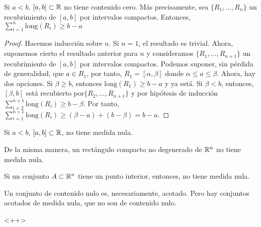 \begin{lema}
	Si $a < b$, $[a,b] \subset \mathbb{R}$ no tiene contenido cero. Más precisamente,
	sea $\{R_1,\dots,R_n\}$ un recubrimiento de $[a,b]$ por intervalos compactos.
	Entonces, $\sum\limits^{n}_{i=1} \text{long}(R_i) \geq b-a$
\end{lema}
\begin{proof}
	Hacemos inducción sobre $n$. Si $n = 1$, el resultado es trivial. Ahora,
	suponemos cierto el resultado anterior para $n$ y consideramos
	$\{R_1,\dots,R_{n+1}\}$ un recubrimiento de $[a,b]$ por intervalos compactos.
	Podemos suponer, sin p\'erdida de generalidad, que $a \in R_1$, por tanto,
	$R_1 = [\alpha,\beta]$ donde $\alpha \leq a \leq \beta$. Ahora, hay dos
	opciones. Si $\beta \geq b$, entonces $\text{long}(R_1) \geq b - a$ y ya está.
	Si $\beta< b$, entonces, $[\beta,b]$ está recubierto por$\{R_2,\dots,R_{n+1}\}$
	y por hipótesis de inducción $\sum\limits^{n+1}_{i=2} \text{long}(R_i) \geq
	b - \beta$. Por tanto, $\sum\limits^{n+1}_{i=1} \text{long}(R_i) \geq
	(\beta - a) + (b - \beta) = b - a$.
\end{proof}
\begin{col*}
	Si $a < b$, $[a,b]\subset \mathbb{R}$, no tiene medida nula.
\end{col*}
\begin{obs*}
	De la misma manera, un rectángulo compacto no degenerado de $\mathbb{R}^n$ no
	tiene medida nula.
\end{obs*}
\begin{col*}
	Si un conjunto $A \subset \mathbb{R}^n$ tiene un punto interior, entonces, no tiene
	medida nula.
\end{col*}

\begin{obs}
	Un conjunto de contenido nulo es, necesariamente, acotado. Pero hay conjuntos
	acotados de medida nula, que no son de contenido nulo.
\end{obs}<++>

